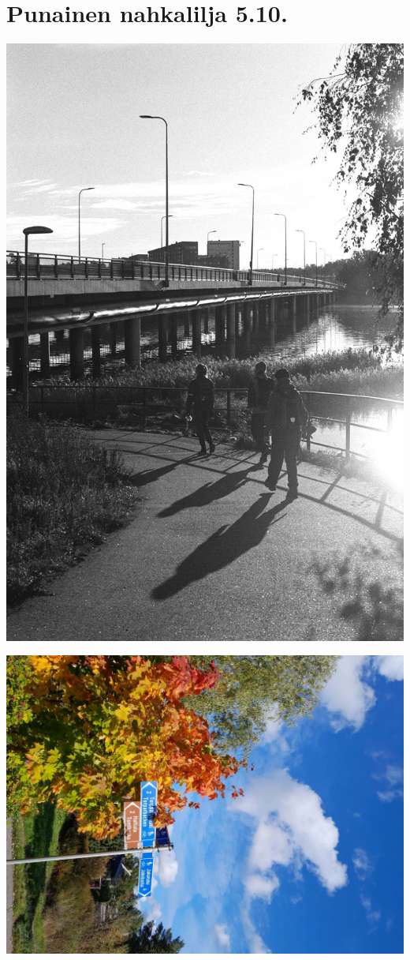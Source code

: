 \section{Punainen nahkalilja 5.10.}\label{section:punainenNahkalilja}

\begin{multicols}{2}
\noindent\includegraphics[width=\linewidth,trim={0 3cm 0 6.75cm},clip]{assets/nahkaliljapunainen1.jpg}

\vfill

\noindent\includegraphics[width=\linewidth,trim={0 0 0 2cm},clip]{assets/nahkaliljapunainen2.jpg}


\end{multicols}
